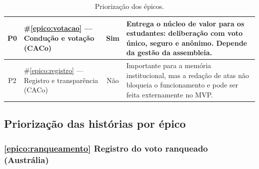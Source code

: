 \documentclass[12pt,a4paper]{article}
\newcounter{epico}
\begin{document}
\begin{table}[H]
\begin{tabular}{|c|m{3.4cm}|c|m{6.7cm}|}
P0 & 
\#\ref{epico:votacao} --- Condução e votação (CACo) & 
Sim & 
Entrega o núcleo de valor para os estudantes: deliberação com voto único, seguro e anônimo. Depende da gestão da assembleia. \\
\hline

P2 & 
\#\ref{epico:registro} --- Registro e transparência (CACo) & 
Não & 
Importante para a memória institucional, mas a redação de atas não bloqueia o funcionamento e pode ser feita externamente no MVP. \\
\hline

\end{tabular}
\caption{Priorização dos épicos.}
\end{table}


\subsection{Priorização das histórias por épico}

\subsubsection{\ref{epico:ranqueamento} Registro do voto ranqueado (Austrália)}
\end{document}
